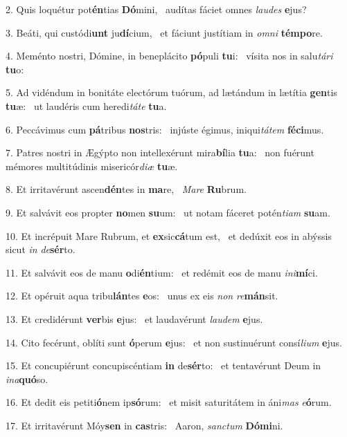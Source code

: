 2. Quis loquétur pot\textbf{én}tias \textbf{Dó}mini, \ast\  audítas fáciet omnes \textit{lau}\textit{des} \textbf{e}jus?\

3. Beáti, qui custódi\textbf{unt} ju\textbf{dí}cium, \ast\  et fáciunt justítiam in \textit{om}\textit{ni} \textbf{tém}\textbf{po}re.\

4. Meménto nostri, Dómine, in beneplácito \textbf{pó}puli \textbf{tu}i: \ast\  vísita nos in salu\textit{tá}\textit{ri} \textbf{tu}o:\

5. Ad vidéndum in bonitáte electórum tuórum, ad lætándum in lætítia \textbf{gen}tis \textbf{tu}æ: \ast\  ut laudéris cum heredi\textit{tá}\textit{te} \textbf{tu}a.\

6. Peccávimus cum \textbf{pá}tribus \textbf{nos}tris: \ast\  injúste égimus, iniqui\textit{tá}\textit{tem} \textbf{fé}\textbf{ci}mus.\

7. Patres nostri in Ægýpto non intellexérunt mira\textbf{bí}lia \textbf{tu}a: \ast\  non fuérunt mémores multitúdinis misericór\textit{di}\textit{æ} \textbf{tu}æ.\

8. Et irritavérunt ascen\textbf{dén}tes in \textbf{ma}re, \ast\  \textit{Ma}\textit{re} \textbf{Ru}brum.\

9. Et salvávit eos propter \textbf{no}men \textbf{su}um: \ast\  ut notam fáceret potén\textit{ti}\textit{am} \textbf{su}am.\

10. Et incrépuit Mare Rubrum, et \textbf{ex}sic\textbf{cá}tum est, \ast\  et dedúxit eos in abýssis sicut \textit{in} \textit{de}\textbf{sér}to.\

11. Et salvávit eos de manu \textbf{o}di\textbf{én}tium: \ast\  et redémit eos de manu \textit{in}\textit{i}\textbf{mí}ci.\

12. Et opéruit aqua tribu\textbf{lán}tes \textbf{e}os: \ast\  unus ex eis \textit{non} \textit{re}\textbf{mán}sit.\

13. Et credidérunt \textbf{ver}bis \textbf{e}jus: \ast\  et laudavérunt \textit{lau}\textit{dem} \textbf{e}jus.\

14. Cito fecérunt, oblíti sunt \textbf{ó}perum \textbf{e}jus: \ast\  et non sustinuérunt consí\textit{li}\textit{um} \textbf{e}jus.\

15. Et concupiérunt concupiscéntiam \textbf{in} de\textbf{sér}to: \ast\  et tentavérunt Deum in \textit{in}\textit{a}\textbf{quó}so.\

16. Et dedit eis petiti\textbf{ó}nem ip\textbf{só}rum: \ast\  et misit saturitátem in áni\textit{mas} \textit{e}\textbf{ó}rum.\

17. Et irritavérunt Móy\textbf{sen} in \textbf{cas}tris: \ast\  Aaron, \textit{sanc}\textit{tum} \textbf{Dó}\textbf{mi}ni.\

